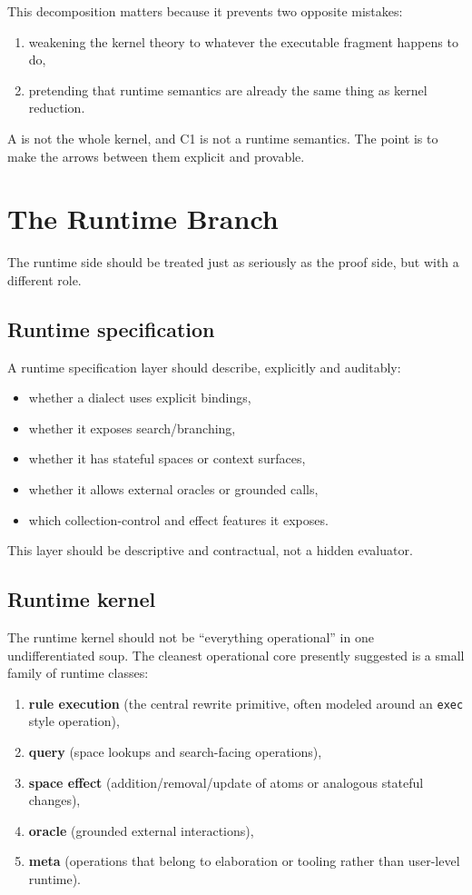 \documentclass[11pt]{article}
\begin{document}
This decomposition matters because it prevents two opposite mistakes:
\begin{enumerate}[label=(\alph*)]
  \item weakening the kernel theory to whatever the executable fragment happens to do,
  \item pretending that runtime semantics are already the same thing as kernel reduction.
\end{enumerate}

A is not the whole kernel, and C1 is not a runtime semantics. The point is to make the arrows between them explicit and provable.

\section{The Runtime Branch}
The runtime side should be treated just as seriously as the proof side, but with a different role.

\subsection{Runtime specification}
A runtime specification layer should describe, explicitly and auditably:
\begin{itemize}
  \item whether a dialect uses explicit bindings,
  \item whether it exposes search/branching,
  \item whether it has stateful spaces or context surfaces,
  \item whether it allows external oracles or grounded calls,
  \item which collection-control and effect features it exposes.
\end{itemize}

This layer should be descriptive and contractual, not a hidden evaluator.

\subsection{Runtime kernel}
The runtime kernel should not be ``everything operational'' in one undifferentiated soup. The cleanest operational core presently suggested is a small family of runtime classes:
\begin{enumerate}[label=(\roman*)]
  \item \textbf{rule execution} (the central rewrite primitive, often modeled around an \texttt{exec} style operation),
  \item \textbf{query} (space lookups and search-facing operations),
  \item \textbf{space effect} (addition/removal/update of atoms or analogous stateful changes),
  \item \textbf{oracle} (grounded external interactions),
  \item \textbf{meta} (operations that belong to elaboration or tooling rather than user-level runtime).
\end{enumerate}
\end{document}
